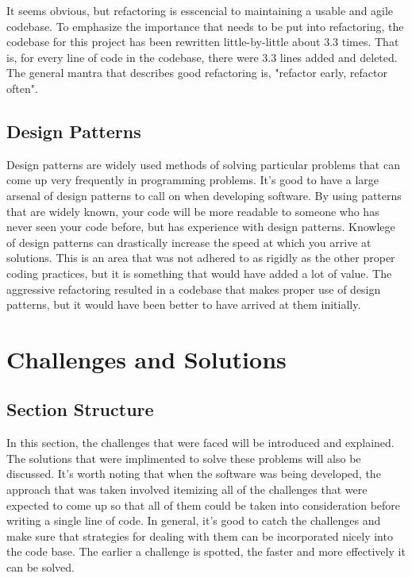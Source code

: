 \documentclass[se]{uw-wkrpt}
\begin{document}
It seems obvious, but refactoring is esscencial to maintaining a usable and agile
codebase. To emphasize the importance that needs to be put into refactoring, the 
codebase for this project has been rewritten little-by-little about 3.3 times.
That is, for every line of code in the codebase, there were 3.3 lines added and deleted.
The general mantra that describes good refactoring is, "refactor early, refactor often".

\subsection{Design Patterns}

Design patterns are widely used methods of solving particular problems that can
come up very frequently in programming problems. It's good to have a large arsenal
of design patterns to call on when developing software. By using patterns that
are widely known, your code will be more readable to someone who has never seen
your code before, but has experience with design patterns. Knowlege of design
patterns can drastically increase the speed at which you arrive at solutions.
This is an area that was not adhered to as rigidly as the other proper coding practices,
but it is something that would have added a lot of value. The aggressive refactoring
resulted in a codebase that makes proper use of design patterns, but it would
have been better to have arrived at them initially.

\section{Challenges and Solutions}

\subsection{Section Structure}

In this section, the challenges that were faced will be introduced and
explained. The solutions that were implimented to solve these problems will
also be discussed. It's worth noting that when the software was being developed, 
the approach that was taken involved itemizing all of the challenges that were 
expected to come up so that all of them could be taken into consideration before 
writing a single line of code. In general, it's good to catch the challenges and
make sure that strategies for dealing with them can be incorporated nicely into
the code base. The earlier a challenge is spotted, the faster and more effectively
it can be solved.
\end{document}

